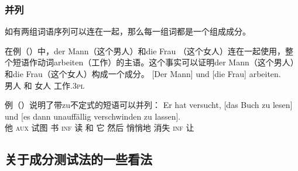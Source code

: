 \subsubsection{并列}

如有两组词语序列可以连在一起，那么每一组词都是一个组成成分。

在例（）中，der Mann（这个男人）和die Frau （这个女人）连在一起使用，整个短语作动词arbeiten（工作）的主语。这个事实可以证明der Mann（这个男人）和die Frau（这个女人）构成一个成分。
\ea
\gll {}[Der        Mann] und [die          Frau] arbeiten.\\
     \spacebr{} 男人   和 \spacebr{} 女人 工作.\textsc{3pl}\\
\z

例（）说明了带zu不定式的短语可以并列：
\ea
\gll Er hat versucht, [das Buch zu lesen] und [es dann unauffällig verschwinden zu lassen].\\
     他 \textsc{aux} 试图 \spacebr{} 书 \textsc{inf} 读 和 \spacebr{}它 然后 悄悄地 消失 \textsc{inf} 让\\
\z

\subsection{关于成分测试法的一些看法}
\label{sec-status-der-ktests}

